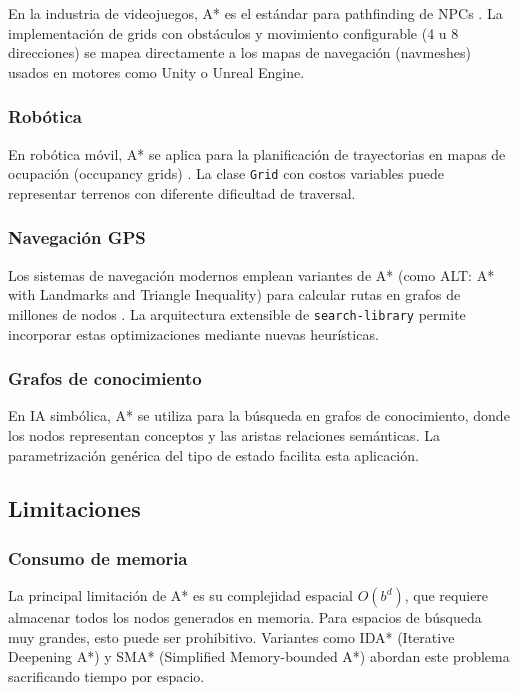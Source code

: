 En la industria de videojuegos, A* es el estándar para pathfinding de NPCs \cite{millington2019ai}. La implementación de grids con obstáculos y movimiento configurable (4 u 8 direcciones) se mapea directamente a los mapas de navegación (navmeshes) usados en motores como Unity o Unreal Engine.

\subsubsection{Robótica}

En robótica móvil, A* se aplica para la planificación de trayectorias en mapas de ocupación (occupancy grids) \cite{lavalle2006planning}. La clase \texttt{Grid} con costos variables puede representar terrenos con diferente dificultad de traversal.

\subsubsection{Navegación GPS}

Los sistemas de navegación modernos emplean variantes de A* (como ALT: A* with Landmarks and Triangle Inequality) para calcular rutas en grafos de millones de nodos \cite{bast2016route}. La arquitectura extensible de \texttt{search-library} permite incorporar estas optimizaciones mediante nuevas heurísticas.

\subsubsection{Grafos de conocimiento}

En IA simbólica, A* se utiliza para la búsqueda en grafos de conocimiento, donde los nodos representan conceptos y las aristas relaciones semánticas. La parametrización genérica del tipo de estado facilita esta aplicación.

\subsection{Limitaciones}

\subsubsection{Consumo de memoria}

La principal limitación de A* es su complejidad espacial $O(b^d)$, que requiere almacenar todos los nodos generados en memoria. Para espacios de búsqueda muy grandes, esto puede ser prohibitivo. Variantes como IDA* (Iterative Deepening A*) \cite{korf1985depth} y SMA* (Simplified Memory-bounded A*) \cite{russell1992efficient} abordan este problema sacrificando tiempo por espacio.

